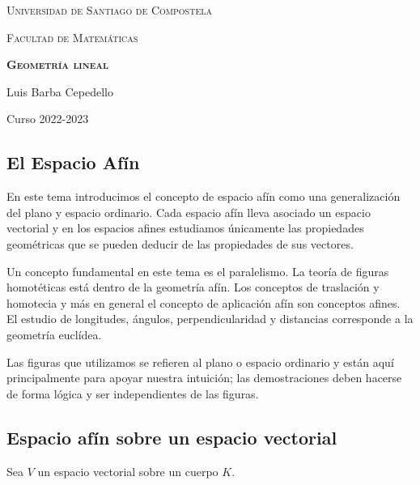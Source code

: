 \documentclass[12pt, a4paper, ones, notitlepage, openany,titlepage]{article}
\date{Curso 2022-2023}
\author{}
\begin{document}
	
	\begin{titlepage}
		
		\centering
		{\scshape\LARGE Universidad de Santiago de Compostela \par}
		\vspace{1cm}
		{\scshape\Large Facultad de Matemáticas \par}
		\vspace{5cm}
		{\bfseries\scshape\Huge Geometría lineal\par}
		\vspace{12cm}
		
		{\Large Luis Barba Cepedello \par}
		\vfill
		{\Large Curso 2022-2023 \par}
	\end{titlepage}
	
	\setlength{\parskip}{0.30cm}
	
	\begin{center}
		\section{El Espacio Afín}
	\end{center}

En este tema introducimos el concepto de espacio afín como una generalización del plano y espacio ordinario. Cada espacio afín lleva asociado un espacio vectorial y en los espacios afines estudiamos únicamente las propiedades geométricas que se pueden deducir de las propiedades de sus vectores.

Un concepto fundamental en este tema es el paralelismo. La teoría de figuras homotéticas está dentro de la geometría afín. Los conceptos de traslación y homotecia y más en general el concepto de aplicación afín son conceptos afines. El estudio de longitudes, ángulos, perpendicularidad y distancias corresponde a la geometría euclídea.

Las figuras que utilizamos se refieren al plano o espacio ordinario y están aquí principalmente para apoyar nuestra intuición; las demostraciones deben hacerse de forma lógica y ser independientes de las figuras.

\subsection{Espacio afín sobre un espacio vectorial}
\noindent Sea $V$ un espacio vectorial sobre un cuerpo $K$.
\end{document}
